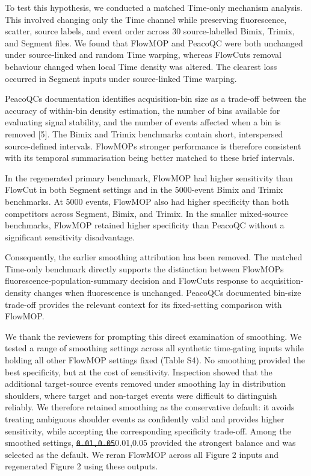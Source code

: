 \documentclass[
  11pt,
  a4paper,
]{article}
\begin{document}
To test this hypothesis, we conducted a matched Time-only mechanism
analysis. This involved changing only the Time channel while preserving
fluorescence, scatter, source labels, and event order across 30
source-labelled Bimix, Trimix, and Segment files. We found that FlowMOP
and PeacoQC were both unchanged under source-linked and random Time
warping, whereas FlowCut\textquotesingle s removal behaviour changed
when local Time density was altered. The clearest loss occurred in
Segment inputs under source-linked Time warping.

PeacoQC\textquotesingle s documentation identifies acquisition-bin size
as a trade-off between the accuracy of within-bin density estimation,
the number of bins available for evaluating signal stability, and the
number of events affected when a bin is removed {[}5{]}. The Bimix and
Trimix benchmarks contain short, interspersed source-defined intervals.
FlowMOP\textquotesingle s stronger performance is therefore consistent
with its temporal summarisation being better matched to these brief
intervals.

In the regenerated primary benchmark, FlowMOP had higher sensitivity
than FlowCut in both Segment settings and in the 5000-event Bimix and
Trimix benchmarks. At 5000 events, FlowMOP also had higher specificity
than both competitors across Segment, Bimix, and Trimix. In the smaller
mixed-source benchmarks, FlowMOP retained higher specificity than
PeacoQC without a significant sensitivity disadvantage.

Consequently, the earlier smoothing attribution has been removed. The
matched Time-only benchmark directly supports the distinction between
FlowMOP\textquotesingle s fluorescence-population-summary decision and
FlowCut\textquotesingle s response to acquisition-density changes when
fluorescence is unchanged. PeacoQC\textquotesingle s documented bin-size
trade-off provides the relevant context for its fixed-setting comparison
with FlowMOP.

We thank the reviewers for prompting this direct examination of
smoothing. We tested a range of smoothing settings across all synthetic
time-gating inputs while holding all other FlowMOP settings fixed (Table
S4). No smoothing provided the best specificity, but at the cost of
sensitivity. Inspection showed that the additional target-source events
removed under smoothing lay in distribution shoulders, where target and
non-target events were difficult to distinguish reliably. We therefore
retained smoothing as the conservative default: it avoids treating
ambiguous shoulder events as confidently valid and provides higher
sensitivity, while accepting the corresponding specificity trade-off.
Among the smoothed settings,
{\color{revisionred}\sout{\texttt{0.01,0.05}}}{\color{revisionblue}0.01,0.05}
provided the strongest balance and was selected as the default. We reran
FlowMOP across all Figure 2 inputs and regenerated Figure 2 using these
outputs.
\end{document}
